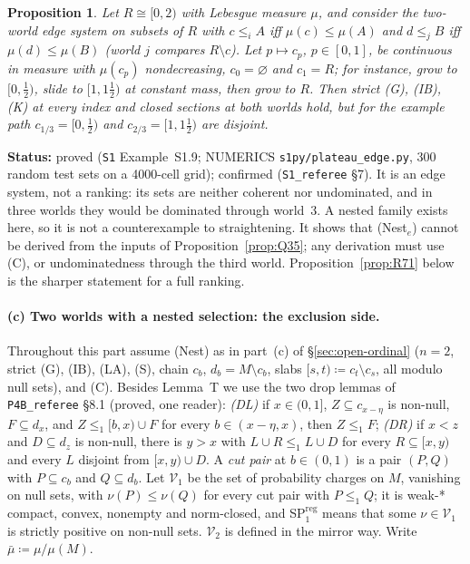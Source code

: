 \documentclass[11pt]{article}
\newtheorem{proposition}[theorem]{Proposition}
\theoremstyle{definition}
\theoremstyle{remark}
\newcommand{\src}[1]{\texttt{#1}}
\newcommand{\status}[1]{\par\smallskip\noindent\textbf{Status:} #1\par\smallskip}
\begin{document}
\begin{proposition}\label{prop:plateau}
Let $R\cong[0,2)$ with Lebesgue measure $\mu$, and consider the two-world edge system on subsets of $R$ with $c\le_iA$ iff $\mu(c)\le\mu(A)$ and $d\le_jB$ iff $\mu(d)\le\mu(B)$ (world $j$ compares $R\setminus c$). Let $p\mapsto c_p$, $p\in[0,1]$, be continuous in measure with $\mu(c_p)$ nondecreasing, $c_0=\varnothing$ and $c_1=R$; for instance, grow to $[0,\tfrac12)$, slide to $[1,1\tfrac12)$ at constant mass, then grow to $R$. Then strict (G), (IB), (K) at every index and closed sections at both worlds hold, but for the example path $c_{1/3}=[0,\tfrac12)$ and $c_{2/3}=[1,1\tfrac12)$ are disjoint.
\end{proposition}
\status{proved (\src{S1} Example~S1.9; NUMERICS \src{s1py/plateau\_edge.py}, 300 random test sets on a 4000-cell grid); confirmed (\src{S1\_referee} \S7). It is an edge system, not a ranking: its sets are neither coherent nor undominated, and in three worlds they would be dominated through world~3. A nested family exists here, so it is not a counterexample to straightening. It shows that (Nest$_e$) cannot be derived from the inputs of Proposition~\ref{prop:Q35}; any derivation must use (C), or undominatedness through the third world. Proposition~\ref{prop:R71} below is the sharper statement for a full ranking.}

\paragraph{(c) Two worlds with a nested selection: the exclusion side.} Throughout this part assume (Nest) as in part~(c) of \S\ref{sec:open-ordinal} ($n=2$, strict (G), (IB), (LA), (S), chain $c_b$, $d_b=M\setminus c_b$, slabs $[s,t)\coloneqq c_t\setminus c_s$, all modulo null sets), and (C). Besides Lemma~T we use the two drop lemmas of \src{P4B\_referee} \S8.1 (proved, one reader): \emph{(DL)} if $x\in(0,1]$, $Z\subseteq c_{x-\eta}$ is non-null, $F\subseteq d_x$, and $Z\le_1[b,x)\cup F$ for every $b\in(x-\eta,x)$, then $Z\le_1F$; \emph{(DR)} if $x<z$ and $D\subseteq d_z$ is non-null, there is $y>x$ with $L\cup R\le_1L\cup D$ for every $R\subseteq[x,y)$ and every $L$ disjoint from $[x,y)\cup D$. A \emph{cut pair} at $b\in(0,1)$ is a pair $(P,Q)$ with $P\subseteq c_b$ and $Q\subseteq d_b$. Let $\mathcal V_1$ be the set of probability charges on $M$, vanishing on null sets, with $\nu(P)\le\nu(Q)$ for every cut pair with $P\le_1Q$; it is weak-* compact, convex, nonempty and norm-closed, and SP$^{\mathrm{reg}}_1$ means that some $\nu\in\mathcal V_1$ is strictly positive on non-null sets. $\mathcal V_2$ is defined in the mirror way. Write $\bar\mu\coloneqq\mu/\mu(M)$.
\end{document}
